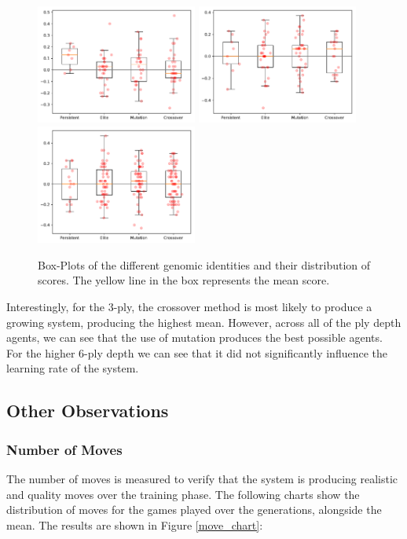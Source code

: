 \documentclass[12pt,a4paper]{article}
\begin{document}
        \begin{figure}[!ht]
            \centering
            \includegraphics[width=53mm]{images/results/1ply/champ_score_distribution.pdf}
            \includegraphics[width=53mm]{images/results/3ply/champ_score_distribution.pdf}
            \includegraphics[width=53mm]{images/results/6ply/champ_score_distribution.pdf}
            \caption{Box-Plots of the different genomic identities and their distribution of scores. The yellow line in the box represents the mean score. \label{champ_score_distribution}}
        \end{figure}

        Interestingly, for the 3-ply, the crossover method is most likely to produce a growing system, producing the highest mean. However, across all of the ply depth agents, we can see that the use of mutation produces the best possible agents. For the higher 6-ply depth we can see that it did not significantly influence the learning rate of the system.

    \subsection{Other Observations}
        \subsubsection{Number of Moves}
            The number of moves is measured to verify that the system is producing realistic and quality moves over the training phase. The following charts show the distribution of moves for the games played over the generations, alongside the mean. The results are shown in Figure \ref{move_chart}:
\end{document}

